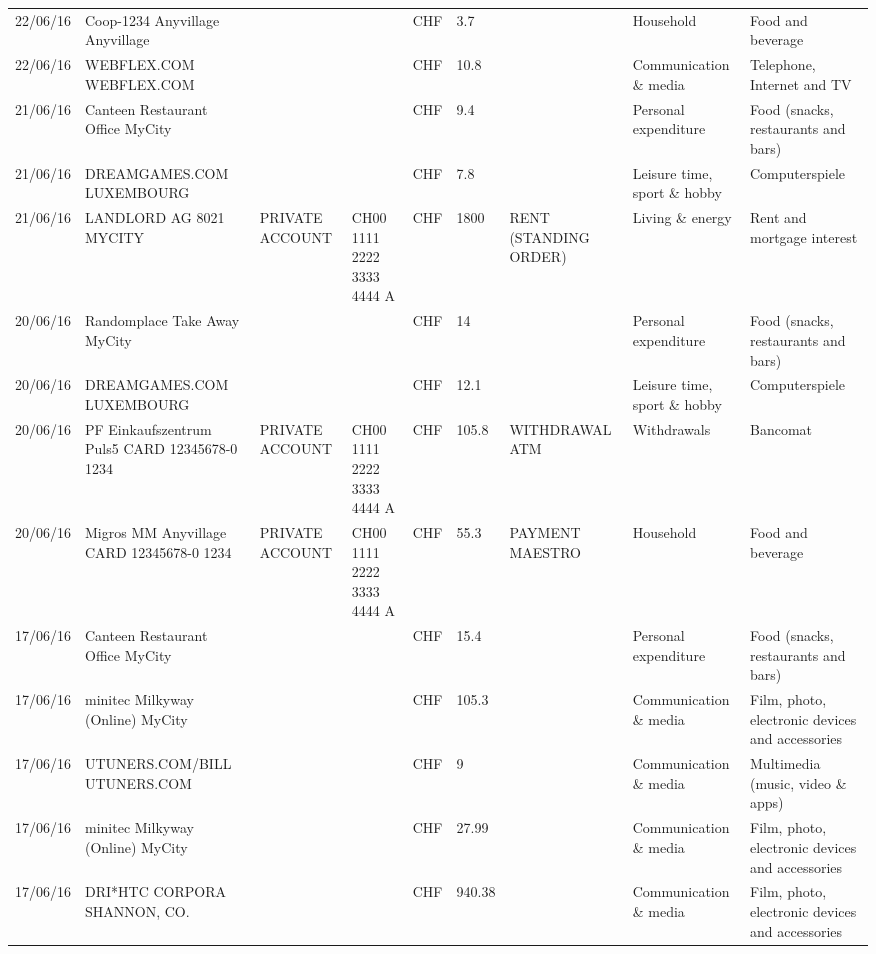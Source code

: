 \begin{landscape}
\begin{table}[t]
\begin{center}
\begin{tabular}{lllllllll}
		22/06/16 & Coop-1234 Anyvillage    Anyvillage &       &       & CHF   & 3.7   &       & Household & Food and beverage \\
		22/06/16 & WEBFLEX.COM              WEBFLEX.COM &       &       & CHF   & 10.8  &       & Communication \& media & Telephone,  Internet and TV \\
		21/06/16 & Canteen Restaurant Office      MyCity &       &       & CHF   & 9.4   &       & Personal expenditure & Food (snacks, restaurants and bars) \\
		21/06/16 & DREAMGAMES.COM           LUXEMBOURG &       &       & CHF   & 7.8   &       & Leisure time, sport \& hobby & Computerspiele \\
		21/06/16 & LANDLORD AG 8021 MYCITY & PRIVATE ACCOUNT & CH00 1111 2222 3333 4444 A & CHF   & 1800  & RENT (STANDING ORDER) & Living \& energy & Rent and mortgage interest \\
		20/06/16 & Randomplace Take Away     MyCity &       &       & CHF   & 14    &       & Personal expenditure & Food (snacks, restaurants and bars) \\
		20/06/16 & DREAMGAMES.COM           LUXEMBOURG &       &       & CHF   & 12.1  &       & Leisure time, sport \& hobby & Computerspiele \\
		20/06/16 & PF Einkaufszentrum Puls5 CARD 12345678-0 1234 & PRIVATE ACCOUNT & CH00 1111 2222 3333 4444 A & CHF   & 105.8 & WITHDRAWAL ATM & Withdrawals & Bancomat \\
		20/06/16 & Migros MM Anyvillage CARD 12345678-0 1234 & PRIVATE ACCOUNT & CH00 1111 2222 3333 4444 A & CHF   & 55.3  & PAYMENT MAESTRO & Household & Food and beverage \\
		17/06/16 & Canteen Restaurant Office      MyCity &       &       & CHF   & 15.4  &       & Personal expenditure & Food (snacks, restaurants and bars) \\
		17/06/16 & minitec Milkyway (Online) MyCity &       &       & CHF   & 105.3 &       & Communication \& media & Film, photo, electronic devices and accessories \\
		17/06/16 & UTUNERS.COM/BILL          UTUNERS.COM &       &       & CHF   & 9     &       & Communication \& media & Multimedia (music, video \& apps) \\
		17/06/16 & minitec Milkyway (Online) MyCity &       &       & CHF   & 27.99 &       & Communication \& media & Film, photo, electronic devices and accessories \\
		17/06/16 & DRI*HTC CORPORA          SHANNON, CO. &       &       & CHF   & 940.38 &       & Communication \& media & Film, photo, electronic devices and accessories \\

\end{tabular}
\end{center}
\end{table}
\end{landscape}
